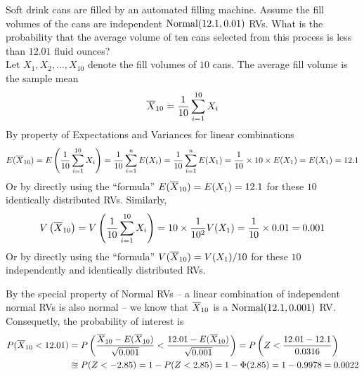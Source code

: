 \begin{ExerciseList}
\Exercise
Soft drink cans are filled by an automated filling machine.  
Assume the fill volumes of the cans are independent $\mbox{{\rm Normal}}(12.1,0.01)$ RVs.  
What is the probability that the average volume of ten cans selected from this process is less than $12.01$ fluid ounces?
\Answer
~\\
Let $X_1,X_2,\ldots,X_{10}$ denote the fill volumes of $10$ cans.  The average fill volume is the sample mean
\[
\overline{X}_{10} = \frac{1}{10} \sum_{i=1}^{10} X_i
\]
By property of Expectations and Variances for linear combinations
\[
E(\overline{X}_{10}) = E \left(\frac{1}{10} \sum_{i=1}^{10} X_i \right) = \frac{1}{10}\sum_{i=1}^nE(X_i) = \frac{1}{10}\sum_{i=1}^nE(X_1) = \frac{1}{10} \times 10 \times E(X_1) = E(X_1) = 12.1
\]
Or by directly using the ``formula'' $E(\overline{X}_{10}) = E(X_1)=12.1$ for these $10$ identically distributed RVs.  
Similarly, 
\[
V\left(\overline{X}_{10}\right) = V \left(\frac{1}{10} \sum_{i=1}^{10} X_i \right) = 10 \times \frac{1}{10^2} V(X_1) = \frac{1}{10} \times 0.01 = 0.001 
\]
Or by directly using the ``formula'' $V(\overline{X}_{10}) = V(X_1)/10$ for these $10$ independently and identically distributed RVs.
 
By the special property of Normal RVs -- a linear combination of independent normal RVs is also normal -- we know that 
$\overline{X}_{10}$ is a $\mbox{{\rm Normal}}(12.1,0.001)$ RV.
Consequetly, the probability of interest is
\begin{align*}
P(\overline{X}_{10} < 12.01) 
&= P \left( \frac{\overline{X}_{10}-E(\overline{X}_{10})}{\sqrt{0.001}} < \frac{12.01 - E(\overline{X}_{10})}{\sqrt{0.001}} \right) = P\left(Z < \frac{12.01-12.1}{0.0316}\right)\\ 
&\approxeq P(Z<-2.85) = 1-P(Z<2.85) = 1-\Phi(2.85) = 1-0.9978=0.0022
\end{align*}


\end{ExerciseList}
